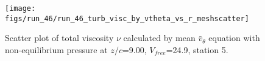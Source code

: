 \begin{figure}[H]
\centering
\texttt{[image: figs/run\_46/run\_46\_turb\_visc\_by\_vtheta\_vs\_r\_meshscatter]}
\caption{Scatter plot of total viscosity $\nu$ calculated by mean $\bar{v}_{\theta}$ equation with non-equilibrium pressure at $z/c$=9.00, $V_{free}$=24.9, station 5.}
\label{fig:run_46_turb_visc_by_vtheta_vs_r_meshscatter}
\end{figure}


